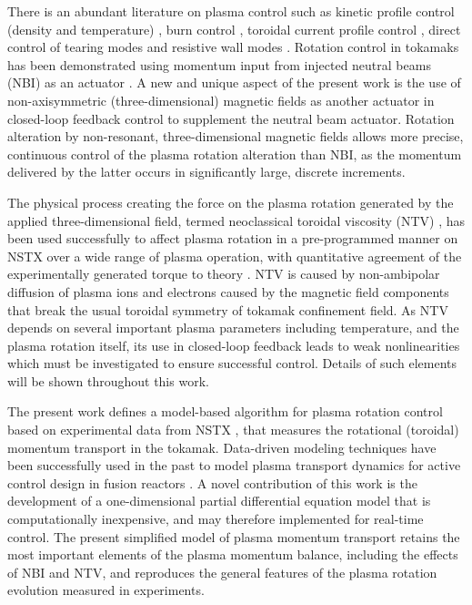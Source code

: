 \documentclass{iopart}
\begin{document}
There is an abundant literature on plasma control such as kinetic profile control (density and temperature) \cite{Schuster02, Boyer11}, burn control \cite{Schuster01, Schuster02-2, Schuster02-3, Vitela98, Boyer12}, toroidal current profile control \cite{Boyer133, Boyer144, Barton12, Ou09, Ebrahimi04}, direct control of tearing modes \cite{Welander13, Volpe09} and resistive wall modes \cite{Sabbagh06,Sabbagh13}. Rotation control in tokamaks has been demonstrated using momentum input from injected neutral beams (NBI) as an actuator \cite{Scoville07}.  A new and unique aspect of the present work is the use of non-axisymmetric (three-dimensional) magnetic fields as another actuator in closed-loop feedback control to supplement the neutral beam actuator. Rotation alteration by non-resonant, three-dimensional magnetic fields allows more precise, continuous control of the plasma rotation alteration than NBI, as the momentum delivered by the latter occurs in significantly large, discrete increments.

The physical process creating the force on the plasma rotation generated by the applied three-dimensional field, termed neoclassical toroidal viscosity (NTV) \cite{Shaing88, Shaing10, Shaing15}, has been used successfully to affect plasma rotation in a pre-programmed manner on NSTX over a wide range of plasma operation, with quantitative agreement of the experimentally generated torque to theory \cite{Zhu06}. NTV is caused by non-ambipolar diffusion of plasma ions and electrons caused by the magnetic field components that break the usual toroidal symmetry of tokamak confinement field. As NTV depends on several important plasma parameters including temperature, and the plasma rotation itself, its use in closed-loop feedback leads to weak nonlinearities which must be investigated to ensure successful control. Details of such elements will be shown throughout this work. 

The present work defines a model-based algorithm for plasma rotation control
based on experimental data from NSTX \cite{Ono00}, that measures the rotational
(toroidal) momentum transport in the tokamak.  Data-driven modeling techniques
have been successfully used in the past to model plasma transport dynamics for
active control design in fusion reactors \cite{Moreau13, Boyer133, Boyer144,
  Barton12}. A novel contribution of this work is the development of a
one-dimensional partial differential equation model that is computationally
inexpensive, and may therefore implemented for real-time control.
%
The present simplified model of plasma momentum transport retains the most
important elements of the plasma momentum balance, including the effects of NBI
and NTV, and reproduces the general features of the plasma rotation evolution
measured in experiments.
\end{document}
